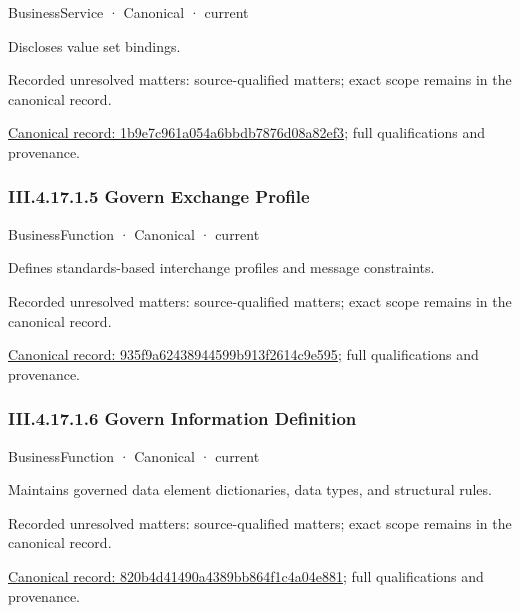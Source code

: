 \label{element:1b9e7c961a054a6bbdb7876d08a82ef3}
{\small BusinessService · Canonical · current}\par

Discloses value set bindings.


{\small Recorded unresolved matters: source-qualified matters; exact scope remains in the canonical record.}\par
{\footnotesize \href{../../../../../../../../continuum/business/business-service/1b9e7c961a054a6bbdb7876d08a82ef3.md}{Canonical record: 1b9e7c961a054a6bbdb7876d08a82ef3}; full qualifications and provenance.}\par
\subsubsection*{III.4.17.1.5 Govern Exchange Profile}
\label{navigation:III.4.17.1.5}

\label{element:935f9a62438944599b913f2614c9e595}
{\small BusinessFunction · Canonical · current}\par

Defines standards-based interchange profiles and message constraints.


{\small Recorded unresolved matters: source-qualified matters; exact scope remains in the canonical record.}\par
{\footnotesize \href{../../../../../../../../continuum/business/business-function/935f9a62438944599b913f2614c9e595.md}{Canonical record: 935f9a62438944599b913f2614c9e595}; full qualifications and provenance.}\par
\subsubsection*{III.4.17.1.6 Govern Information Definition}
\label{navigation:III.4.17.1.6}

\label{element:820b4d41490a4389bb864f1c4a04e881}
{\small BusinessFunction · Canonical · current}\par

Maintains governed data element dictionaries, data types, and structural rules.


{\small Recorded unresolved matters: source-qualified matters; exact scope remains in the canonical record.}\par
{\footnotesize \href{../../../../../../../../continuum/business/business-function/820b4d41490a4389bb864f1c4a04e881.md}{Canonical record: 820b4d41490a4389bb864f1c4a04e881}; full qualifications and provenance.}\par
